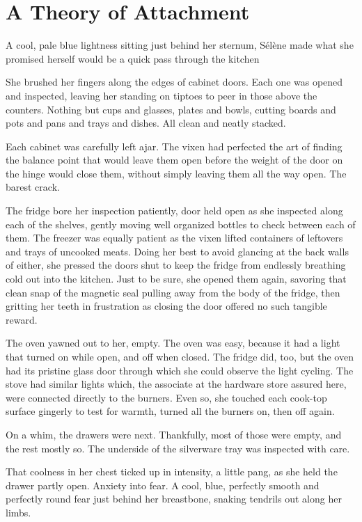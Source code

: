 \hypertarget{a-theory-of-attachment}{%
\chapter{A Theory of Attachment}\label{a-theory-of-attachment}}

A cool, pale blue lightness sitting just behind her sternum, Sélène made what she promised herself would be a quick pass through the kitchen

She brushed her fingers along the edges of cabinet doors. Each one was opened and inspected, leaving her standing on tiptoes to peer in those above the counters. Nothing but cups and glasses, plates and bowls, cutting boards and pots and pans and trays and dishes. All clean and neatly stacked.

Each cabinet was carefully left ajar. The vixen had perfected the art of finding the balance point that would leave them open before the weight of the door on the hinge would close them, without simply leaving them all the way open. The barest crack.

The fridge bore her inspection patiently, door held open as she inspected along each of the shelves, gently moving well organized bottles to check between each of them. The freezer was equally patient as the vixen lifted containers of leftovers and trays of uncooked meats. Doing her best to avoid glancing at the back walls of either, she pressed the doors shut to keep the fridge from endlessly breathing cold out into the kitchen. Just to be sure, she opened them again, savoring that clean snap of the magnetic seal pulling away from the body of the fridge, then gritting her teeth in frustration as closing the door offered no such tangible reward.

The oven yawned out to her, empty. The oven was easy, because it had a light that turned on while open, and off when closed. The fridge did, too, but the oven had its pristine glass door through which she could observe the light cycling. The stove had similar lights which, the associate at the hardware store assured here, were connected directly to the burners. Even so, she touched each cook-top surface gingerly to test for warmth, turned all the burners on, then off again.

On a whim, the drawers were next. Thankfully, most of those were empty, and the rest mostly so. The underside of the silverware tray was inspected with care.

That coolness in her chest ticked up in intensity, a little pang, as she held the drawer partly open. Anxiety into fear. A cool, blue, perfectly smooth and perfectly round fear just behind her breastbone, snaking tendrils out along her limbs.

